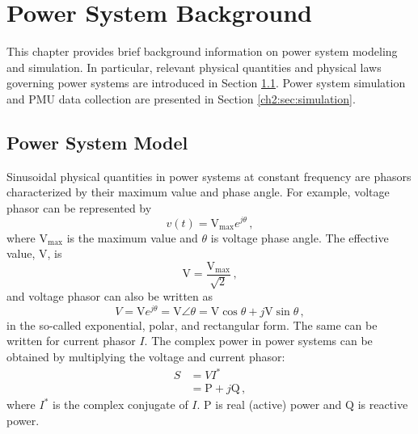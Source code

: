 
\chapter{Power System Background}
\label{ch:ps_background}
\vspace{2em}

This chapter provides brief background information on power system modeling and simulation. In particular, relevant physical quantities and physical laws governing power systems are introduced in Section \ref{ch2:sec:ps_model}. Power system simulation and PMU data collection are presented in Section \ref{ch2:sec:simulation}.

\section{Power System Model}
\label{ch2:sec:ps_model}

Sinusoidal physical quantities in power systems at constant frequency are phasors characterized by their maximum value and phase angle. For example, voltage phasor can be represented by
\begin{equation}
    v(t) = \text{V}_{\text{max}}e^{j\theta} \,,
\end{equation}
where $\text{V}_{\text{max}}$ is the maximum value and $\theta$ is voltage phase angle. The effective value, $\text{V}$, is 
\begin{equation}
    \text{V} = \frac{\text{V}_{\text{max}}}{\sqrt{2}} \,,
\end{equation}
and voltage phasor can also be written as 
\begin{equation}
    V = \text{V}e^{j\theta} = \text{V}\angle\theta = \text{V}\cos\theta + j\text{V}\sin\theta \,,
\end{equation}
in the so-called exponential, polar, and rectangular form. The same can be written for current phasor $I$. The complex power in power systems can be obtained by multiplying the voltage and current phasor:
\begin{align}
    S &= VI^* \\
      &= \text{P} + j\text{Q} \,,
\end{align}
where $I^*$ is the complex conjugate of $I$. $\text{P}$ is real (active) power and $\text{Q}$ is reactive power. 

